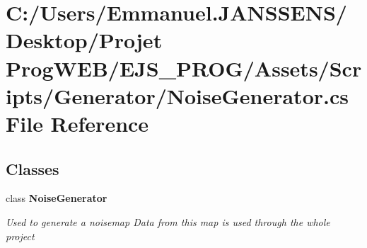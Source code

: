 \section{C\+:/\+Users/\+Emmanuel.J\+A\+N\+S\+S\+E\+N\+S/\+Desktop/\+Projet Prog\+W\+E\+B/\+E\+J\+S\+\_\+\+P\+R\+O\+G/\+Assets/\+Scripts/\+Generator/\+Noise\+Generator.cs File Reference}
\label{_noise_generator_8cs}
\subsection*{Classes}
\begin{DoxyCompactItemize}
\item 
class \textbf{ Noise\+Generator}
\begin{DoxyCompactList}\small\item\em Used to generate a noisemap Data from this map is used through the whole project \end{DoxyCompactList}\end{DoxyCompactItemize}
